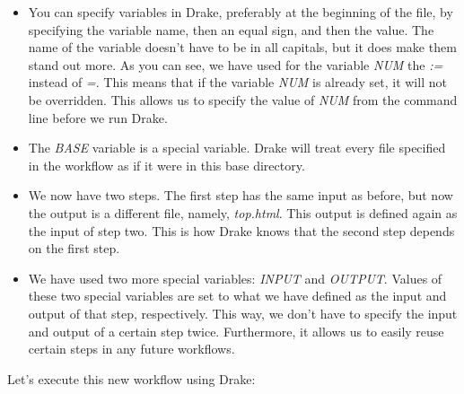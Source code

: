 \documentclass[
]{book}
\newenvironment{Shaded}{\begin{snugshade}}{\end{snugshade}}
\newcommand{\BuiltInTok}[1]{#1}
\newcommand{\ExtensionTok}[1]{#1}
\newcommand{\NormalTok}[1]{#1}
\newcommand{\OperatorTok}[1]{\textcolor[rgb]{0.81,0.36,0.00}{\textbf{#1}}}
\providecommand{\tightlist}{%
  \setlength{\itemsep}{0pt}\setlength{\parskip}{0pt}}
\theoremstyle{definition}
\theoremstyle{definition}
\theoremstyle{definition}
\theoremstyle{remark}
\begin{document}
\begin{itemize}
\tightlist
\item
  You can specify variables in Drake, preferably at the beginning of the file, by specifying the variable name, then an equal sign, and then the value. The name of the variable doesn't have to be in all capitals, but it does make them stand out more. As you can see, we have used for the variable \emph{NUM} the \emph{:=} instead of \emph{=}. This means that if the variable \emph{NUM} is already set, it will not be overridden. This allows us to specify the value of \emph{NUM} from the command line before we run Drake.
\item
  The \emph{BASE} variable is a special variable. Drake will treat every file specified in the workflow as if it were in this base directory.
\item
  We now have two steps. The first step has the same input as before, but now the output is a different file, namely, \emph{top.html}. This output is defined again as the input of step two. This is how Drake knows that the second step depends on the first step.
\item
  We have used two more special variables: \emph{INPUT} and \emph{OUTPUT}. Values of these two special variables are set to what we have defined as the input and output of that step, respectively. This way, we don't have to specify the input and output of a certain step twice. Furthermore, it allows us to easily reuse certain steps in any future workflows.
\end{itemize}

Let's execute this new workflow using Drake:

\begin{Shaded}
\end{Shaded}
\end{document}
